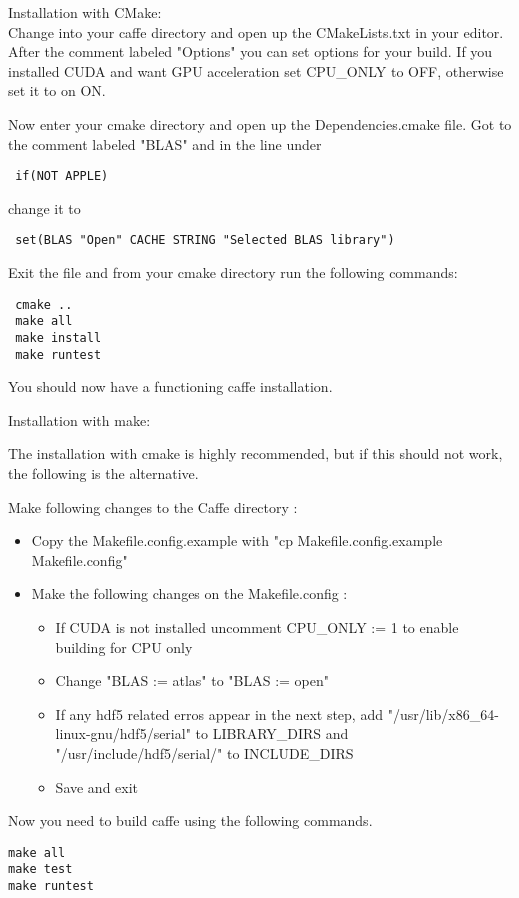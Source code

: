 \documentclass[main.tex]{subfiles}
\begin{document}
 Installation with CMake:\\
 
 Change into your caffe directory and open up the CMakeLists.txt in your editor. After the comment labeled "Options" you can set options for your build. If you installed CUDA and want GPU acceleration set CPU\_ONLY to OFF, otherwise set it to on ON.
 
 Now enter your cmake directory and open up the Dependencies.cmake file. Got to the comment labeled "BLAS" and in the line under 
 
 \begin{lstlisting}
 if(NOT APPLE)
 \end{lstlisting}
 
 change it to 
 
 \begin{lstlisting}
 set(BLAS "Open" CACHE STRING "Selected BLAS library")
 \end{lstlisting}
 
 Exit the file and from your cmake directory run the following commands:
 \begin{lstlisting}
 cmake ..
 make all
 make install
 make runtest
 \end{lstlisting}
 You should now have a functioning caffe installation.

\newpage
 
 
 
 
Installation with make:

The installation with cmake is highly recommended, but if this should not work, the following is the alternative.

 Make following changes to the Caffe directory : 
 \begin{itemize}
 \item Copy the Makefile.config.example with "cp Makefile.config.example Makefile.config"
 \item Make the following changes on the Makefile.config :
 	\begin{itemize}
 	\item If CUDA is not installed uncomment CPU\_ONLY := 1 to enable building for CPU only
 	\item Change "BLAS := atlas" to "BLAS := open"
 	\item If any hdf5 related erros appear in the next step, add "/usr/lib/x86\_64-linux-gnu/hdf5/serial" to LIBRARY\_DIRS and "/usr/include/hdf5/serial/" to INCLUDE\_DIRS
 	\item Save and exit
 	\end{itemize}
 	
 \end{itemize}
Now you need to build caffe using the following commands.
\begin{lstlisting}
make all
make test
make runtest  
\end{lstlisting}

 
\end{document}
